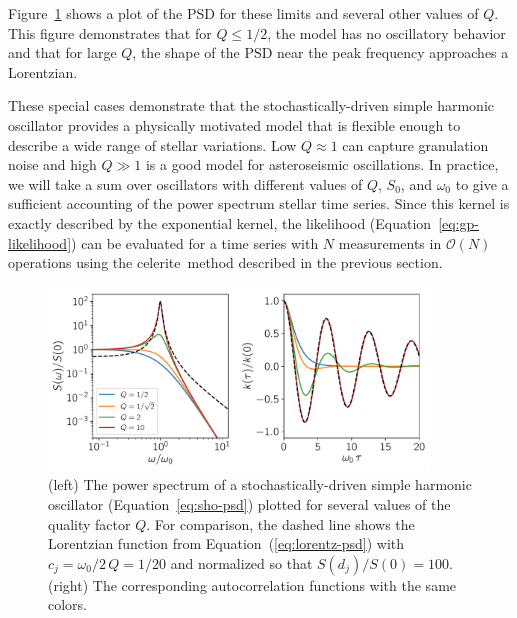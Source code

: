 \documentclass[manuscript, letterpaper]{aastex6}
\makeatletter
\let\origsection\section
\renewcommand\section{\@ifstar{\starsection}{\nostarsection}}
\newcommand\nostarsection[1]{\sectionprelude\origsection{#1}}
\newcommand\starsection[1]{\sectionprelude\origsection*{#1}}
\newcommand\sectionprelude{\vspace{1em}}
\newcommand{\project}[1]{\textsf{#1}}
\newcommand{\celerite}{\project{celerite}}
\newcommand{\figureref}[1]{\ref{fig:#1}}
\newcommand{\Figure}[1]{Figure~\figureref{#1}}
\newcommand{\figurelabel}[1]{\label{fig:#1}}
\renewcommand{\eqref}[1]{\ref{eq:#1}}
\newcommand{\Eq}[1]{Equation~(\eqref{#1})}
\newcommand{\eq}[1]{\Eq{#1}}
\newcommand{\eqalt}[1]{Equation~\eqref{#1}}
\makeatother
\begin{document}
\Figure{sho} shows a plot of the PSD for these limits and several other values
of $Q$.
This figure demonstrates that for $Q \le 1/2$, the model has no oscillatory
behavior and that for large $Q$, the shape of the PSD near the peak frequency
approaches a Lorentzian.

These special cases demonstrate that the stochastically-driven simple harmonic
oscillator provides a physically motivated model that is flexible enough to
describe a wide range of stellar variations.
Low $Q \approx 1$ can capture granulation noise and high $Q \gg 1$ is a good
model for asteroseismic oscillations.
In practice, we will take a sum over oscillators with different values of $Q$,
$S_0$, and $\omega_0$ to give a sufficient accounting of the power spectrum
stellar time series.
Since this kernel is exactly described by the exponential kernel, the
likelihood (\eqalt{gp-likelihood}) can be evaluated for a time series with $N$
measurements in $\mathcal{O}(N)$ operations using the \celerite\ method
described in the previous section.

\begin{figure}[!htbp]
\begin{center}
\includegraphics[width=0.9\textwidth]{figures/sho.pdf}
\caption{(left) The power spectrum of a stochastically-driven simple harmonic
    oscillator (\eqalt{sho-psd}) plotted for several values of the quality
    factor $Q$.
    For comparison, the dashed line shows the Lorentzian function from
    \eq{lorentz-psd} with $c_j = \omega_0/2\,Q = 1/20$ and normalized so that
    $S(d_j)/S(0) = 100$.
    (right) The corresponding autocorrelation functions with the same colors.
    \figurelabel{sho}}
\end{center}
\end{figure}


\section{Examples with simulated data}
\end{document}
